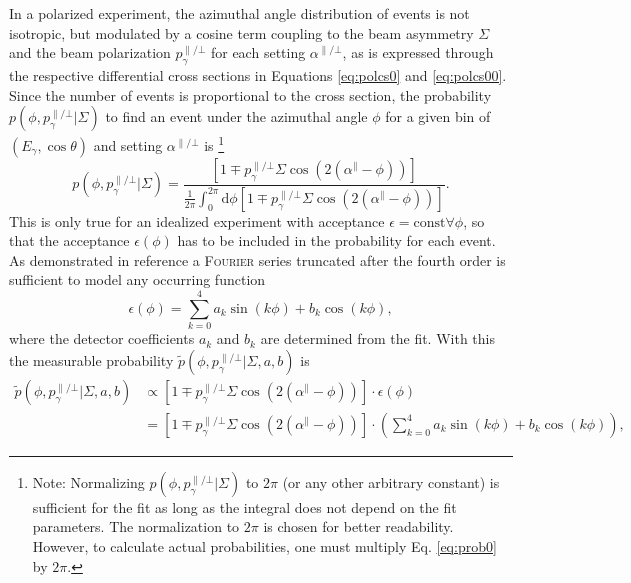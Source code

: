 In a polarized experiment, the azimuthal angle distribution of events is not isotropic, but modulated by a cosine term coupling to the beam asymmetry $\Sigma$ and the beam polarization $p_\gamma^{\parallel/\bot}$ for each setting $\alpha^{\parallel/\bot}$, as is expressed through the respective differential cross sections in Equations \ref{eq:polcs0} and \ref{eq:polcs00}. Since the number of events is proportional to the cross section, the probability $p\left(\phi,p_\gamma^{\parallel/\bot}\big|\Sigma\right)$ to find an event under the azimuthal angle $\phi$ for a given bin of $\left(E_\gamma,\cos\theta\right)$ and setting $\alpha^{\parallel/\bot}$ is \footnote{Note: Normalizing $p\left(\phi,p_\gamma^{\parallel/\bot}\big|\Sigma\right)$ to $2\pi$ (or any other arbitrary constant) is sufficient for the fit as long as the integral does not depend on the fit parameters. The normalization to $2\pi$ is chosen for better readability. However, to calculate actual probabilities, one must multiply Eq. \eqref{eq:prob0} by $2\pi$.} \begin{equation}
	p\left(\phi,p_\gamma^{\parallel/\bot}\big|\Sigma\right)=\frac{\left[1\mp p_\gamma^{\parallel/\bot}\Sigma\cos\left(2\left(\alpha^\parallel-\phi\right)\right)\right]}{\frac{1}{2\pi}\int_{0}^{2\pi}\text{d}\phi\left[1\mp p_\gamma^{\parallel/\bot}\Sigma\cos\left(2\left(\alpha^\parallel-\phi\right)\right)\right] }.
	\label{eq:prob0}
\end{equation}
This is only true for an idealized experiment with acceptance $\epsilon=\text{const}\forall\phi$, so that the acceptance $\epsilon(\phi)$ has to be included in the probability for each event. As demonstrated in reference \cite{hartmannphd} a \textsc{Fourier} series truncated after the fourth order is sufficient to model any occurring function $$\epsilon\left(\phi\right)=\sum_{k=0}^4a_k\sin\left( k\phi\right)+b_k\cos\left(k\phi\right),$$ where the detector coefficients $a_k$ and $b_k$ are determined from the fit. With this the measurable probability $\tilde{p}\left(\phi,p_\gamma^{\parallel/\bot}\big|\Sigma,a,b\right)$ is 
\begin{align}
	\tilde{p}\left(\phi,p_\gamma^{\parallel/\bot}\big|\Sigma,a,b\right)&\propto\left[1\mp p_\gamma^{\parallel/\bot}\Sigma\cos\left(2\left(\alpha^\parallel-\phi\right)\right)\right]\cdot\epsilon(\phi)\\&=\left[1\mp p_\gamma^{\parallel/\bot}\Sigma\cos\left(2\left(\alpha^\parallel-\phi\right)\right)\right]\cdot\left(\sum_{k=0}^4a_k\sin\left( k\phi\right)+b_k\cos\left(k\phi\right)\right),
\end{align}
